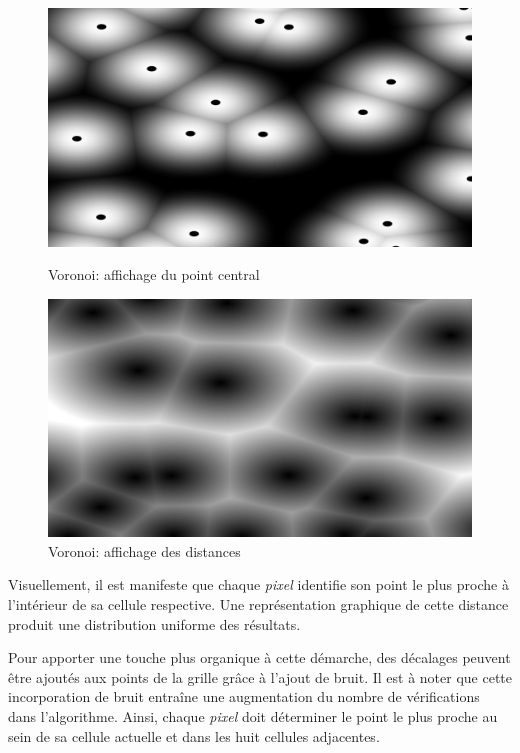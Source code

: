 \begin{figure}[h]
  \begin{minipage}[b]{0.45\linewidth}
    \centering
    \includegraphics[width=\linewidth]{images/noise/noise16.JPG}
    \caption{Voronoi: affichage du point central}
    \label{noise16}
  \end{minipage}
  \hspace{0.1\linewidth} %
  \begin{minipage}[b]{0.45\linewidth}
    \centering
    \includegraphics[width=\linewidth]{images/noise/noise17.JPG}
    \caption{Voronoi: affichage des distances}
    \label{noise17}
  \end{minipage}
\end{figure}


Visuellement, il est manifeste que chaque \textit{pixel} identifie son point le plus proche à l'intérieur de sa cellule respective. Une représentation graphique de cette distance produit une distribution uniforme des résultats.

Pour apporter une touche plus organique à cette démarche, des décalages peuvent être ajoutés aux points de la grille grâce à l'ajout de bruit. Il est à noter que cette incorporation de bruit entraîne une augmentation du nombre de vérifications dans l'algorithme. Ainsi, chaque \textit{pixel} doit déterminer le point le plus proche au sein de sa cellule actuelle et dans les huit cellules adjacentes.

